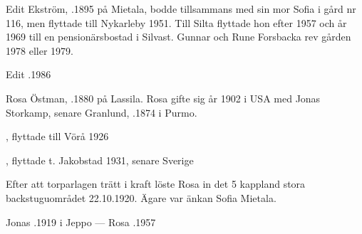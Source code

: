 %
Edit Ekström, .1895 på Mietala, bodde tillsammans med sin mor Sofia i gård nr 116, men flyttade till Nykarleby 1951. Till Silta flyttade hon efter 1957 och år 1969 till en pensionärsbostad i Silvast. Gunnar och Rune Forsbacka rev gården 1978 eller 1979.

Edit .1986



%
Rosa Östman, .1880 på Lassila. Rosa gifte sig år 1902 i USA med Jonas Storkamp, senare Granlund,  .1874 i Purmo.
\begin{jhchildren}
  \item {}, flyttade till Vörå 1926
  \item {}
  \item {}
  \item {}
  \item {}, flyttade t. Jakobstad 1931, senare Sverige
\end{jhchildren}

Efter att torparlagen trätt i kraft löste Rosa in det 5 kappland stora backstuguområdet 22.10.1920. Ägare var änkan Sofia Mietala.

Jonas .1919 i Jeppo  --- 	Rosa .1957


